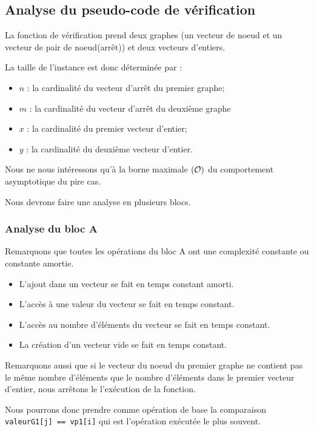 \documentclass[class=article]{standalone}
\begin{document}
\subsection*{Analyse du pseudo-code de vérification}

La fonction de vérification prend deux graphes 
(un vecteur de noeud et un vecteur de pair de noeud(arrêt))
et deux vecteurs d'entiers.

La taille de l'instance est donc déterminée par :
\begin{itemize}
  \item $n$ : la cardinalité du vecteur d'arrêt du premier graphe;
  \item $m$ : la cardinalité du vecteur d'arrêt du deuxième graphe
  \item $x$ : la cardinalité du premier vecteur d'entier;
  \item $y$ : la cardinalité du deuxième vecteur d'entier.
\end{itemize}

Nous ne nous intéressons qu'à la borne maximale $\left ( \mathcal{O} \right )$ 
du comportement asymptotique du pire cas.

Nous devrons faire une analyse en plusieurs blocs.

\subsubsection*{Analyse du bloc A}

Remarquons que toutes les opérations du bloc A 
ont une complexité constante ou constante amortie.

\begin{itemize}
  \item L'ajout dans un vecteur se fait en temps constant amorti.
  \item L'accès à une valeur du vecteur se fait en temps constant.
  \item L'accès au nombre d'éléments du vecteur se fait en temps constant.
  \item La création d'un vecteur vide se fait en temps constant.
\end{itemize}

Remarquons aussi que si le vecteur du noeud du premier graphe
ne contient pas le même nombre d'éléments que le nombre d'éléments 
dans le premier vecteur d'entier, nous arrêtons le l'exécution de
la fonction.

Nous pourrons donc prendre comme opération de base
la comparaison \lstinline{valeurG1[j] == vp1[i]} qui
est l'opération exécutée le plus souvent.
\end{document}
